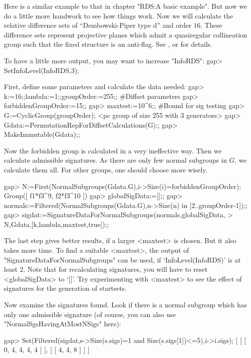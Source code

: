 
Here is a similar example to that in chapter "RDS:A basic example". But
now we do a little more handwork to see how things work.  Now we will
calculate the relative difference sets of ``Dembowski-Piper type d''
and order $16$. These difference sets represent projective planes
which admit a quasiregular collineation group such that the fixed
structure is an anti-flag. See \cite{DembowskiPiper}, \cite{Dembowski}
or \cite{RoederDiss} for details.

To have a little more output, you may want to increase "InfoRDS":
\begintt
gap> SetInfoLevel(InfoRDS,3);
\endtt

First, define some parameters and calculate the data needed:
\beginexample
gap> k:=16;;lambda:=1;;groupOrder:=255;; #Diffset parameters
gap> forbiddenGroupOrder:=15;;
gap> maxtest:=10^6;;                     #Bound for sig testing
gap> G:=CyclicGroup(groupOrder);
<pc group of size 255 with 3 generators>
gap> Gdata:=PermutationRepForDiffsetCalculations(G);;
gap> MakeImmutable(Gdata);; 
\endexample

Now the forbidden group is calculated in a very ineffective way. Then
we calculate admissible signatures. As there are only few normal
subgroups in $G$, we calculate them all. For other groups, one should
choose more wisely.

\beginexample
gap> N:=First(NormalSubgroups(Gdata.G),i->Size(i)=forbiddenGroupOrder);
Group([ f1*f3^9, f2*f3^10 ])
gap> globalSigData:=[];;
gap> normals:=Filtered(NormalSubgroups(Gdata.G),n->Size(n) in [2..groupOrder-1]);; 
gap> sigdat:=SignatureDataForNormalSubgroups(normals,globalSigData,
>                             N,Gdata,[k,lambda,maxtest,true]);;
\endexample

The last step gives better results, if a larger <maxtest> is chosen.
But it also takes more time. To find a suitable <maxtest>, the output
of "SignatureDataForNormalSubgroups" can be used, if
`InfoLevel(InfoRDS)' is at least $2$. Note that for recalculating
signatures, you will have to reset <globalSigData> to `[]'. Try experimenting
with <maxtest> to see the effect of signatures for the generation of
startsets.

Now examine the signatures found. Look if there is a normal subgroup
which has only one admissible signature (of course, you can also use
"NormalSgsHavingAtMostNSigs" here):

\beginexample
gap> Set(Filtered(sigdat,s->Size(s.sigs)=1 and Size(s.sigs[1])<=5),i->i.sigs);
[ [ [ 0, 4, 4, 4, 4 ] ], [ [ 4, 4, 8 ] ] ]
\endexample

